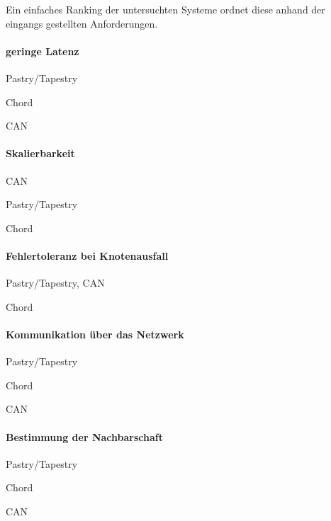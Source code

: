 Ein einfaches Ranking der untersuchten Systeme ordnet diese anhand der eingangs gestellten Anforderungen.
\begin{multicols}{2}

\paragraph{geringe Latenz}
\begin{enumerate*}
\item Pastry/Tapestry
\item Chord
\item CAN
\end{enumerate*}


\paragraph{Skalierbarkeit}
\begin{enumerate*}
\item CAN
\item Pastry/Tapestry
\item Chord
\end{enumerate*}

\paragraph{Fehlertoleranz bei Knotenausfall}
\begin{enumerate*}
\item Pastry/Tapestry, CAN
\item Chord
\end{enumerate*}

\paragraph{Kommunikation über das Netzwerk}
\begin{enumerate*}
\item Pastry/Tapestry
\item Chord
\item CAN
\end{enumerate*}

\paragraph{Bestimmung der Nachbarschaft}
\begin{enumerate*}
\item Pastry/Tapestry
\item Chord
\item CAN
\end{enumerate*}


\end{multicols}
